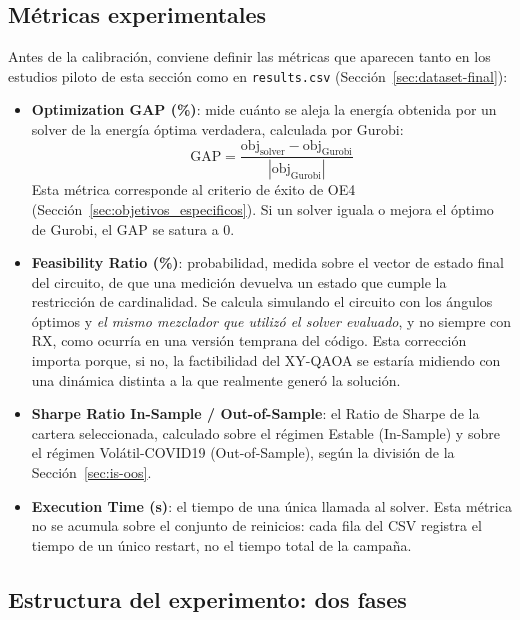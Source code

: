 \subsection{Métricas experimentales}
\label{subsec:metricas-experimentales}

Antes de la calibración, conviene definir las métricas que aparecen tanto en los estudios piloto de esta sección como en \texttt{results.csv} (Sección~\ref{sec:dataset-final}):

\begin{itemize}
    \item \textbf{Optimization GAP (\%)}: mide cuánto se aleja la energía obtenida por un solver de la energía óptima verdadera, calculada por Gurobi:
    \begin{equation}
        \text{GAP} = \frac{\text{obj}_{\text{solver}} - \text{obj}_{\text{Gurobi}}}{|\text{obj}_{\text{Gurobi}}|}
        \label{eq:gap}
    \end{equation}
    Esta métrica corresponde al criterio de éxito de OE4 (Sección~\ref{sec:objetivos_especificos}). Si un solver iguala o mejora el óptimo de Gurobi, el GAP se satura a 0.
    \item \textbf{Feasibility Ratio (\%)}: probabilidad, medida sobre el vector de estado final del circuito, de que una medición devuelva un estado que cumple la restricción de cardinalidad. Se calcula simulando el circuito con los ángulos óptimos y \emph{el mismo mezclador que utilizó el solver evaluado}, y no siempre con RX, como ocurría en una versión temprana del código. Esta corrección importa porque, si no, la factibilidad del XY-QAOA se estaría midiendo con una dinámica distinta a la que realmente generó la solución.
    \item \textbf{Sharpe Ratio In-Sample / Out-of-Sample}: el Ratio de Sharpe de la cartera seleccionada, calculado sobre el régimen Estable (In-Sample) y sobre el régimen Volátil-COVID19 (Out-of-Sample), según la división de la Sección~\ref{sec:is-oos}.
    \item \textbf{Execution Time (s)}: el tiempo de una única llamada al solver. Esta métrica no se acumula sobre el conjunto de reinicios: cada fila del CSV registra el tiempo de un único restart, no el tiempo total de la campaña.
\end{itemize}

\subsection{Estructura del experimento: dos fases}
\label{subsec:estructura-experimento}

